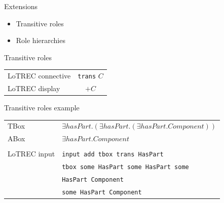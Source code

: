 \documentclass{beamer}
\begin{document}
\begin{frame}{Extensions}

\begin{itemize}
\item Transitive roles
\item Role hierarchies
\end{itemize}

\end{frame}

\begin{frame}{Transitive roles}

\begin{table}[h]
\begin{center}
\begin{tabular}{l c}
LoTREC connective & \texttt{trans} $C$ \\
LoTREC display & $+C$ \\
\end{tabular}
\end{center}
\end{table}

\begin{table}[h]
\begin{center}
\end{center}
\end{table}

\end{frame}

\begin{frame}{Transitive roles example}

\begin{table}[h]
\begin{center}
\begin{tabular}{l l}
TBox & $\exists{}hasPart.(\exists{}hasPart.(\exists{}hasPart.Component))$ \\
ABox & $\exists{}hasPart.Component$ \\
\\
LoTREC input & \texttt{input add tbox trans HasPart} \\
 & \texttt{tbox some HasPart some HasPart some}\\
 & \texttt{HasPart Component}\\
 & \texttt{some HasPart Component} \\
\end{tabular}
\end{center}
\end{table}

\end{frame}
\end{document}
